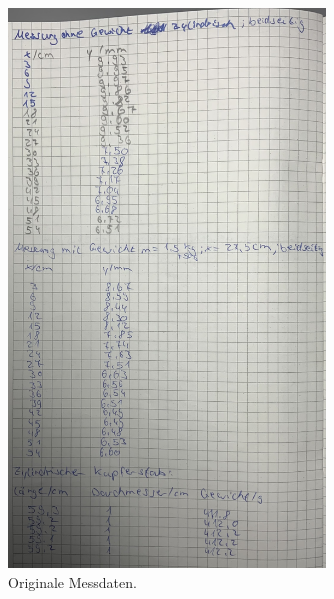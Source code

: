 \begin{figure}
    \centering
    \includegraphics[width=0.75\textwidth]{Dateien/Bild3.jpeg}
    \caption{Originale Messdaten.}
    \label{fig:daten3}
\end{figure}

